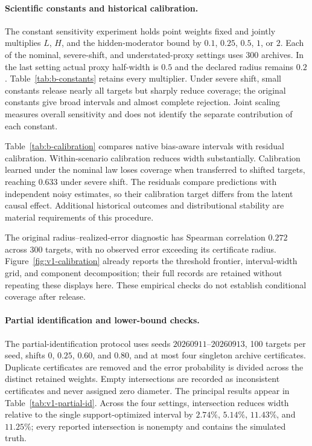 \paragraph{Scientific constants and historical calibration.}
\label{app:certificate-calibration}
The constant sensitivity experiment holds point weights fixed and jointly multiplies $L$, $H$, and the hidden-moderator bound by $0.1$, $0.25$, $0.5$, $1$, or $2$. Each of the nominal, severe-shift, and understated-proxy settings uses 300 archives. In the last setting actual proxy half-width is $0.5$ and the declared radius remains $0.2$. Table~\ref{tab:b-constants} retains every multiplier. Under severe shift, small constants release nearly all targets but sharply reduce coverage; the original constants give broad intervals and almost complete rejection. Joint scaling measures overall sensitivity and does not identify the separate contribution of each constant.


Table~\ref{tab:b-calibration} compares native bias-aware intervals with residual calibration. Within-scenario calibration reduces width substantially. Calibration learned under the nominal law loses coverage when transferred to shifted targets, reaching $0.633$ under severe shift. The residuals compare predictions with independent noisy estimates, so their calibration target differs from the latent causal effect. Additional historical outcomes and distributional stability are material requirements of this procedure.


The original radius--realized-error diagnostic has Spearman correlation $0.272$ across 300 targets, with no observed error exceeding its certificate radius. Figure~\ref{fig:v1-calibration} already reports the threshold frontier, interval-width grid, and component decomposition; their full records are retained without repeating these displays here. These empirical checks do not establish conditional coverage after release.

\paragraph{Partial identification and lower-bound checks.}
\label{app:partial-identification}
The partial-identification protocol uses seeds $20260911$--$20260913$, 100 targets per seed, shifts $0$, $0.25$, $0.60$, and $0.80$, and at most four singleton archive certificates. Duplicate certificates are removed and the error probability is divided across the distinct retained weights. Empty intersections are recorded as inconsistent certificates and never assigned zero diameter. The principal results appear in Table~\ref{tab:v1-partial-id}. Across the four settings, intersection reduces width relative to the single support-optimized interval by $2.74\%$, $5.14\%$, $11.43\%$, and $11.25\%$; every reported intersection is nonempty and contains the simulated truth.

